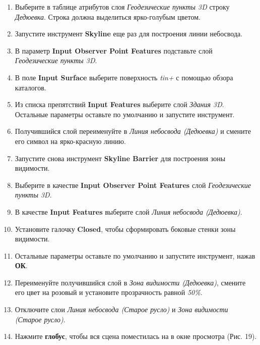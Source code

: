 \documentclass[]{book}
\theoremstyle{definition}
\theoremstyle{definition}
\theoremstyle{definition}
\theoremstyle{remark}
\begin{document}
\begin{enumerate}
\def\labelenumi{\arabic{enumi}.}
\item
  Выберите в таблице атрибутов слоя \emph{Геодезические пункты 3D}
  строку \emph{Дедюевка}. Строка должна выделиться ярко-голубым цветом.
\item
  Запустите инструмент \textbf{Skyline} еще раз для построения линии
  небосвода.
\item
  В параметр \textbf{Input Observer Point Features} подставьте слой
  \emph{Геодезические пункты 3D}.
\item
  В поле \textbf{Input Surface} выберите поверхность \emph{tin+} с
  помощью обзора каталогов.
\item
  Из списка препятствий \textbf{Input Features} выберите слой
  \emph{Здания 3D}. Остальные параметры оставьте по умолчанию и
  запустите инструмент.
\item
  Получившийся слой переименуйте в \emph{Линия небосвода (Дедюевка)} и
  смените его символ на ярко-красную линию.
\item
  Запустите снова инструмент \textbf{Skyline Barrier} для построения
  зоны видимости.
\item
  Выберите в качестве \textbf{Input Observer Point Features} слой
  \emph{Геодезические пункты 3D}.
\item
  В качестве \textbf{Input Features} выберите слой \emph{Линия небосвода
  (Дедюевка)}.
\item
  Установите галочку \textbf{Closed}, чтобы сформировать боковые стенки
  зоны видимости.
\item
  Остальные параметры оставьте по умолчанию и запустите инструмент,
  нажав \textbf{ОК}.
\item
  Переименуйте получившийся слой в \emph{Зона видимости (Дедюевка)},
  смените его цвет на розовый и установите прозрачность равной
  \emph{50\%}.
\item
  Отключите слои \emph{Линия небосвода (Старое русло)} и \emph{Зона
  видимости (Старое русло)}.
\item
  Нажмите \textbf{глобус}, чтобы вся сцена поместилась на в окне
  просмотра (Рис. 19).


\end{enumerate}
\end{document}
